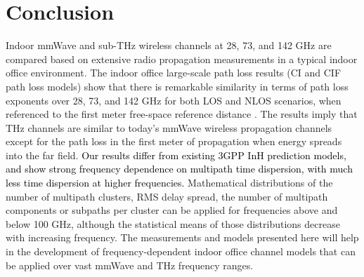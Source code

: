 \documentclass[conference]{IEEEtran}
\begin{document}
\section{Conclusion}\label{conclusion}
Indoor mmWave and sub-THz wireless channels at 28, 73, and 142 GHz are compared based on extensive radio propagation measurements in a typical indoor office environment. The indoor office large-scale path loss results (CI and CIF path loss models) show that there is remarkable similarity in terms of path loss exponents over 28, 73, and 142 GHz for both LOS and NLOS scenarios, when referenced to the first meter free-space reference distance \cite{Sun16b,Mac15b,rappaport2013millimeter}. The results imply that THz channels are similar to today's mmWave wireless propagation channels except for the path loss in the first meter of propagation when energy spreads into the far field. \textcolor{black}{Our results differ from existing 3GPP InH prediction models, and show strong frequency dependence on multipath time dispersion, with much less time dispersion at higher frequencies.} Mathematical distributions of the number of multipath clusters, RMS delay spread, the number of multipath components or subpaths per cluster can be applied for frequencies above and below 100 GHz, although the statistical means of those distributions decrease with increasing frequency. The measurements and models presented here will help in the development of frequency-dependent indoor office channel models that can be applied over vast mmWave and THz frequency ranges.
 



\end{document}
